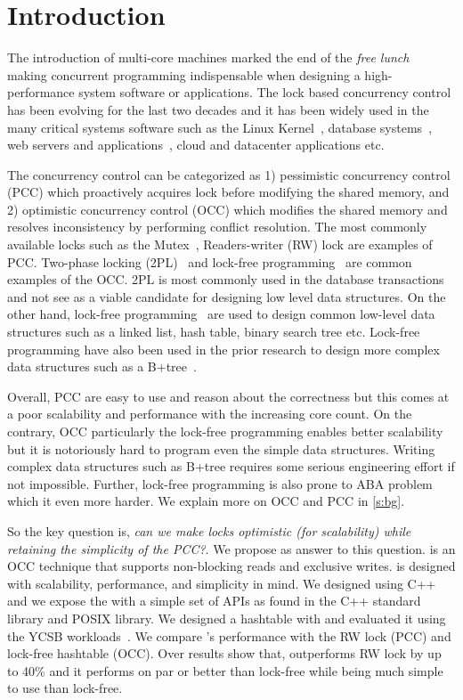 \section{Introduction}
\label{s:intro}

The introduction of multi-core machines marked the end of the \emph{free lunch}
~\cite{herb-sutter, shuffl-locks} making concurrent programming indispensable 
when designing a high-performance system software or applications. The lock
based concurrency control has been evolving for the last two decades and it has
been widely used in the many critical systems software such as the Linux
Kernel~\cite{}, database systems~\cite{}, web servers and applications~\cite{},
cloud and datacenter applications\cite{} etc.

The concurrency control can be categorized as 1) pessimistic concurrency control
(PCC) which proactively acquires lock before modifying the shared memory, and
2) optimistic concurrency control (OCC) which modifies the shared memory and
resolves inconsistency by performing conflict resolution. The most commonly
available locks such as the Mutex~\cite{}, Readers-writer (RW) lock are examples
of PCC. Two-phase locking (2PL)~\cite{} and lock-free programming~\cite{} are
common examples of the OCC. 2PL is most commonly used in the database
transactions and not see as a viable candidate for designing low level data
structures. On the other hand, lock-free programming~\cite{} are used to 
design common low-level data structures such as a linked list, hash table, 
binary search tree etc. Lock-free programming have also been used in the 
prior research to design more complex data structures such as a B+tree~\cite{}. 

Overall, PCC are easy to use and reason about the correctness but this comes at
a poor scalability and performance with the increasing core count. On the
contrary, OCC particularly the lock-free programming 
enables better
scalability but it is notoriously hard to program even the simple data
structures. Writing complex data structures such as B+tree requires some serious
engineering effort if not impossible. Further, lock-free programming is also
prone to ABA problem~\cite{} which it even more harder. We explain more 
on OCC and PCC in \autoref{s:bg}.

So the key question is, \emph{can we make locks optimistic (for scalability) while
retaining the simplicity of the PCC?}. We propose \sys as answer to this
question. \sys is an OCC technique that supports non-blocking reads and
exclusive writes. \sys is designed with scalability, performance, and simplicity
in mind. 
We designed \sys using C++ and we expose the \sys with a simple set of
APIs as found in the C++ standard library and POSIX library. We designed a
hashtable with \sys and evaluated it using the YCSB workloads~\cite{}. We
compare \sys's performance with the RW lock (PCC) and lock-free hashtable (OCC).
Over results show that, \sys outperforms RW lock by up to 40\% and it performs
on par or better than lock-free while being much simple to use than lock-free.  
